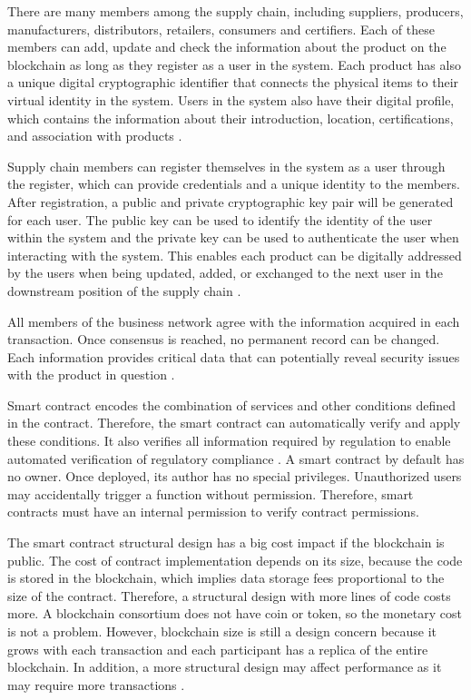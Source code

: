 There are many members among the supply chain, including suppliers, producers, manufacturers, distributors, retailers, consumers and certifiers. Each of these members can add, update and check the information about the product on the blockchain as long as they register as a user in the system. Each product has also a unique digital cryptographic identifier that connects the physical items to their virtual identity in the system. Users in the system also have their digital profile, which contains the information about their introduction, location, certifications, and association with products \cite{tian2017supply}.

Supply chain members can register themselves in the system as a user through the register, which can provide credentials and a unique identity to the members. After registration, a public and private cryptographic key pair will be generated for each user. The public key can be used to identify the identity of the user within the system and the private key can be used to authenticate the user when interacting with the system. This enables each product can be digitally addressed by the users when being updated, added, or exchanged to the next user in the downstream position of the supply chain \cite{caro2018blockchain}.

All members of the business network agree with the information acquired in each transaction. Once consensus is reached, no permanent record can be changed. Each information provides critical data that can potentially reveal security issues with the product in question \cite{galvez2018future}.

Smart contract encodes the combination of services and other conditions defined in the contract. Therefore, the smart contract can automatically verify and apply these conditions. It also verifies all information required by regulation to enable automated verification of regulatory compliance \cite{lu2017adaptable}.  A smart contract by default has no owner. Once deployed, its author has no special privileges. Unauthorized users may accidentally trigger a function without permission. Therefore, smart contracts must have an internal permission to verify contract permissions.

The smart contract structural design has a big cost impact if the blockchain is public. The cost of contract implementation depends on its size, because the code is stored in the blockchain, which implies data storage fees proportional to the size of the contract. Therefore, a structural design with more lines of code costs more. A blockchain consortium does not have coin or token, so the monetary cost is not a problem. However, blockchain size is still a design concern because it grows with each transaction and each participant has a replica of the entire blockchain. In addition, a more structural design may affect performance as it may require more transactions \cite{lu2017adaptable}.

